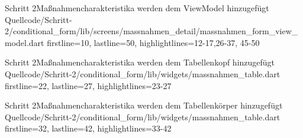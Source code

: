 \begin{alexlisting}{Schritt 2}{Maßnahmencharakteristika werden dem ViewModel hinzugefügt}
  {Quellcode/Schritt-2/conditional_form/lib/screens/massnahmen_detail/massnahmen_form_view_model.dart}
  {firstline=10, lastline=50, highlightlines={12-17,26-37, 45-50}}
  \label{lst:Schritt2MaßnahmencharakteristikaWerdenDemViewModelHinzugefuegt}
\end{alexlisting}

\begin{alexlisting}{Schritt 2}{Maßnahmencharakteristika werden dem Tabellenkopf hinzugefügt}
  {Quellcode/Schritt-2/conditional_form/lib/widgets/massnahmen_table.dart}
  {firstline=22, lastline=27, highlightlines={23-27}}
  \label{lst:Schritt2MaßnahmencharakteristikaEerdenDemTabellenkopfHinzugefuegt}
\end{alexlisting}


\begin{alexlisting}{Schritt 2}{Maßnahmencharakteristika werden dem Tabellenkörper hinzugefügt}
  {Quellcode/Schritt-2/conditional_form/lib/widgets/massnahmen_table.dart}
  {firstline=32, lastline=42, highlightlines={33-42}}
  \label{lst:Schritt2MaßnahmencharakteristikaWerdenDemTabellenkoerperHinzugefuegt}
\end{alexlisting}


